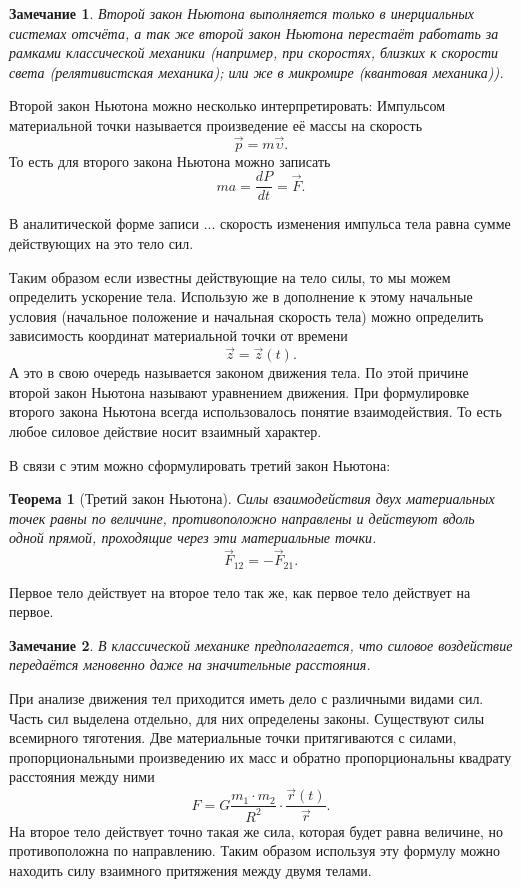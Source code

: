 \documentclass[10pt]{extbook}
\newtheorem{theorem}{Теорема}[section]
\newtheorem{corollary}{Замечание}[theorem]
\begin{document}
\begin{corollary}
	Второй закон Ньютона выполняется только в инерциальных системах отсчёта, а так
	же второй закон Ньютона перестаёт работать за рамками классической механики
	(например, при скоростях, близких к скорости света (релятивистская механика);
	или же в микромире (квантовая механика)).
\end{corollary}

Второй закон Ньютона можно несколько интерпретировать:
Импульсом материальной точки называется произведение её массы на скорость \[
	\vec{p} = m \vec{\upsilon}
	.\] То есть для второго закона Ньютона можно записать \[
	m a = \frac{d P}{d t} = \vec{F}
	.\]

В аналитической форме записи ... скорость изменения импульса тела равна сумме
действующих на это тело сил.

Таким образом если известны действующие на тело силы, то мы можем определить
ускорение тела. Использую же в дополнение к этому начальные условия (начальное
положение и начальная скорость тела) можно определить зависимость координат
материальной точки от времени \[
	\vec{z} = \vec{z}(t)
	.\] А это в свою очередь называется законом движения тела. По этой причине
второй закон Ньютона называют уравнением движения. При формулировке второго
закона Ньютона всегда использовалось понятие взаимодействия. То есть любое
силовое действие носит взаимный характер.

В связи с этим можно сформулировать третий закон Ньютона:
\begin{theorem}[Третий закон Ньютона]
	Силы взаимодействия двух материальных точек равны по величине, противоположно
	направлены и действуют вдоль одной прямой, проходящие через эти материальные
	точки.\[
		\vec{F}_{12} = - \vec{F}_{21}
		.\]
\end{theorem}

Первое тело действует на второе тело так же, как первое тело действует на
первое.

\begin{corollary}
	В классической механике предполагается, что силовое воздействие передаётся
	мгновенно даже на значительные расстояния.
\end{corollary}

При анализе движения тел приходится иметь дело с различными видами сил. Часть
сил выделена отдельно, для них определены законы. Существуют силы всемирного
тяготения. Две материальные точки притягиваются с силами, пропорциональными
произведению их масс и обратно пропорциональны квадрату расстояния между ними
\[
	F = G \frac{m_1 \cdot m_2}{R^2} \cdot \frac{\vec{r}(t)}{\vec{r}}
	.\] На второе тело действует точно такая же сила, которая будет равна
величине, но противоположна по направлению. Таким образом используя эту
формулу можно находить силу взаимного притяжения между двумя телами.
\end{document}

